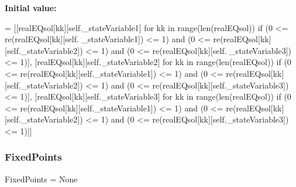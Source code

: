 {\bfseries Initial value\+:}
\begin{DoxyCode}
= [[realEQsol[kk][self.\_stateVariable1] \textcolor{keywordflow}{for} kk \textcolor{keywordflow}{in} range(len(realEQsol)) \textcolor{keywordflow}{if} (0 <= re(realEQsol[kk][self.
      \_stateVariable1]) <= 1) \textcolor{keywordflow}{and} (0 <= re(realEQsol[kk][self.\_stateVariable2]) <= 1) \textcolor{keywordflow}{and} (0 <= re(realEQsol[kk][self.
      \_stateVariable3]) <= 1)], 
                                 [realEQsol[kk][self.\_stateVariable2] \textcolor{keywordflow}{for} kk \textcolor{keywordflow}{in} range(len(realEQsol)) \textcolor{keywordflow}{if} (0
       <= re(realEQsol[kk][self.\_stateVariable1]) <= 1) \textcolor{keywordflow}{and} (0 <= re(realEQsol[kk][self.\_stateVariable2]) <= 1) \textcolor{keywordflow}{
      and} (0 <= re(realEQsol[kk][self.\_stateVariable3]) <= 1)],
                                 [realEQsol[kk][self.\_stateVariable3] \textcolor{keywordflow}{for} kk \textcolor{keywordflow}{in} range(len(realEQsol)) \textcolor{keywordflow}{if} (0
       <= re(realEQsol[kk][self.\_stateVariable1]) <= 1) \textcolor{keywordflow}{and} (0 <= re(realEQsol[kk][self.\_stateVariable2]) <= 1) \textcolor{keywordflow}{
      and} (0 <= re(realEQsol[kk][self.\_stateVariable3]) <= 1)]]
\end{DoxyCode}
\mbox{\label{class_mu_mo_t_1_1_mu_mo_t_1_1_mu_mo_tvector_view_a7a971a839d61106558ebf0453849cfd1}} 
\subsubsection{\texorpdfstring{Fixed\+Points}{FixedPoints}\hspace{0.1cm}{\footnotesize\ttfamily [2/2]}}
{\footnotesize\ttfamily Fixed\+Points = None\hspace{0.3cm}{\ttfamily [static]}}

\mbox{\label{class_mu_mo_t_1_1_mu_mo_t_1_1_mu_mo_tvector_view_ab964c8e9f2533c9bf4957faf67de7149}} 

